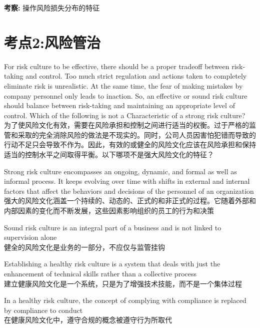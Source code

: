 \documentclass{article}
\newcounter{question} %
\newcommand{\checklist}[1]{
    \textbf{考察:} #1 \par %
    \addcontentsline{toc}{subsection}{题号\thequestion 考察: #1} %
    \vspace{2em} %
}
\begin{document}
\checklist{操作风险损失分布的特征}





\section{考点2:风险管治}
\setcounter{question}{0}
\begin{question}
    For risk culture to be effective, there should be a proper tradeoff between risk-taking and control. Too much strict regulation and actions taken to completely eliminate risk is unrealistic. At the same time, the fear of making mistakes by company personnel only leads to inaction. So, an effective or sound risk culture should balance between risk-taking and maintaining an appropriate level of control. Which of the following is not a Characteristic of a strong risk culture?\\
    为了使风险文化有效，需要在风险承担和控制之间进行适当的权衡。过于严格的监管和采取的完全消除风险的做法是不现实的。同时，公司人员因害怕犯错而导致的行动不足只会导致不作为。因此，有效的或健全的风险文化应该在风险承担和保持适当的控制水平之间取得平衡。以下哪项不是强大风险文化的特征？
\end{question}

\begin{choices}
    \item Strong risk culture encompasses an ongoing, dynamic, and formal as well as informal process. It keeps evolving over time with shifts in external and internal factors that affect the behaviors and decisions of the personnel of an organization\\强大的风险文化涵盖一个持续的、动态的、正式的和非正式的过程。它随着外部和内部因素的变化而不断发展，这些因素影响组织的员工的行为和决策
    \item Sound risk culture is an integral part of a business and is not linked to supervision alone\\健全的风险文化是业务的一部分，不应仅与监管挂钩
    \item Establishing a healthy risk culture is a system that deals with just the enhancement of technical skills rather than a collective process\\建立健康风险文化是一个系统，只是为了增强技术技能，而不是一个集体过程
    \item In a healthy risk culture, the concept of complying with compliance is replaced by compliance to conduct\\在健康风险文化中，遵守合规的概念被遵守行为所取代
\end{choices}
\end{document}
